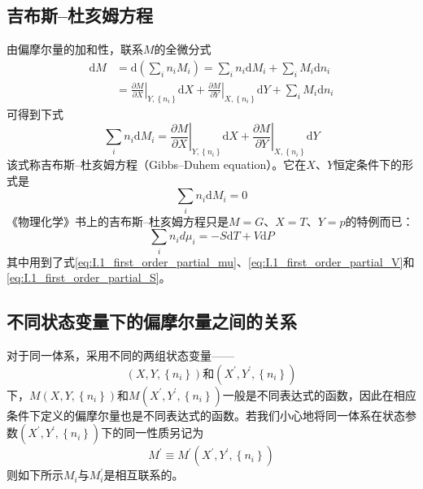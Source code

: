 \documentclass[main.tex]{subfiles}
\begin{document}
\subsection{吉布斯--杜亥姆方程}
由偏摩尔量的加和性，联系$M$的全微分式
\begin{align*}
    \mathrm{d}M & =\mathrm{d}\left(\sum_in_iM_i\right)=\sum_in_i\mathrm{d}M_i+\sum_iM_i\mathrm{d}n_i                                                                                                \\
                & =\left.\frac{\partial M}{\partial X}\right|_{Y,\left\{n_i\right\}}\mathrm{d}X+\left.\frac{\partial M}{\partial Y}\right|_{X,\left\{n_i\right\}}\mathrm{d}Y+\sum_iM_i\mathrm{d}n_i
\end{align*}
可得到下式
\begin{equation}\label{eq:II.2_Gibbs_Duhem_eq}
    \sum_in_i\mathrm{d}M_i=\left.\frac{\partial M}{\partial X}\right|_{Y,\left\{n_i\right\}}\mathrm{d}X+\left.\frac{\partial M}{\partial Y}\right|_{X,\left\{n_i\right\}}\mathrm{d}Y
\end{equation}
该式称吉布斯--杜亥姆方程（Gibbs--Duhem equation）。它在$X$、$Y$恒定条件下的形式是
\begin{equation}\label{eq:II.2_Gibbs_Duhem_eq_XYConst}
    \sum_in_i\mathrm{d}M_i=0
\end{equation}
《物理化学》书上的吉布斯--杜亥姆方程只是$M=G$、$X=T$、$Y=p$的特例而已：
\begin{equation}\label{eq:II.2_Gibbs_Duhem_eq_for_G}
    \sum_in_id\mu_i=-S\mathrm{d}T+V\mathrm{d}P
\end{equation}
其中用到了式\eqref{eq:I.1_first_order_partial_mu}、\eqref{eq:I.1_first_order_partial_V}和\eqref{eq:I.1_first_order_partial_S}。


\subsection{不同状态变量下的偏摩尔量之间的关系}
对于同一体系，采用不同的两组状态变量——
\[\left(X,Y,\left\{n_i\right\}\right)\text{和}\left(X^\prime,Y^\prime,\left\{n_i\right\}\right)\]
下，$M\left(X,Y,\left\{n_i\right\}\right)$和$M\left(X^\prime, Y^\prime,\left\{n_i\right\}\right)$一般是不同表达式的函数，因此在相应条件下定义的偏摩尔量也是不同表达式的函数。若我们小心地将同一体系在状态参数$\left(X^\prime,Y^\prime,\left\{n_i\right\}\right)$下的同一性质另记为
\[M^\prime\equiv M^\prime\left(X^\prime,Y^\prime,\left\{n_i\right\}\right)\]
则如下所示$M_i$与$M_i^\prime$是相互联系的。
\end{document}
